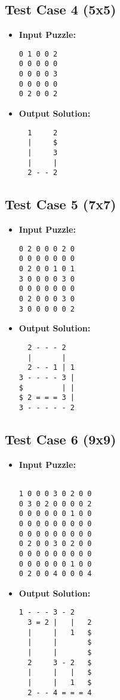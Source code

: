 \subsection{Test Case 4 (5x5)}
\begin{itemize}
    \item \textbf{Input Puzzle:}
    \begin{verbatim}
0 1 0 0 2
0 0 0 0 0
0 0 0 0 3
0 0 0 0 0
0 2 0 0 2
    \end{verbatim}
    \item \textbf{Output Solution:}
    \begin{verbatim}
  1     2
  |     $
  |     3
  |     |
  2 - - 2
    \end{verbatim}
\end{itemize}

\subsection{Test Case 5 (7x7)}
\begin{itemize}
    \item \textbf{Input Puzzle:}
    \begin{verbatim}
0 2 0 0 0 2 0
0 0 0 0 0 0 0
0 2 0 0 1 0 1
3 0 0 0 0 3 0
0 0 0 0 0 0 0
0 2 0 0 0 3 0
3 0 0 0 0 0 2

    \end{verbatim}
    \item \textbf{Output Solution:}
    \begin{verbatim}
  2 - - - 2  
  |       |  
  2 - - 1 | 1
3 - - - - 3 |
$         | |
$ 2 = = = 3 |
3 - - - - - 2
    \end{verbatim}
\end{itemize}

\subsection{Test Case 6 (9x9)}
\begin{itemize}
    \item \textbf{Input Puzzle:}
    \begin{verbatim}

1 0 0 0 3 0 2 0 0
0 3 0 2 0 0 0 0 2
0 0 0 0 0 0 1 0 0
0 0 0 0 0 0 0 0 0
0 0 0 0 0 0 0 0 0
0 2 0 0 3 0 2 0 0
0 0 0 0 0 0 0 0 0
0 0 0 0 0 0 1 0 0
0 2 0 0 4 0 0 0 4

    \end{verbatim}
    \item \textbf{Output Solution:}
    \begin{verbatim}
1 - - - 3 - 2    
  3 = 2 |   |   2
  |     |   1   $
  |     |       $
  |     |       $
  2     3 - 2   $
  |     |   |   $
  |     |   1   $
  2 - - 4 = = = 4
    \end{verbatim}
\end{itemize}

